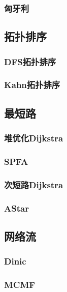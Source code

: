 \documentclass{ctexart}
\begin{document}
\subsubsection{匈牙利}

\subsection{拓扑排序}
\subsubsection{DFS拓扑排序}

\subsubsection{Kahn拓扑排序}

\subsection{最短路}
\subsubsection{堆优化Dijkstra}

\subsubsection{SPFA}

\subsubsection{次短路Dijkstra}

\subsubsection{AStar}

\subsection{网络流}
\subsubsection{Dinic}

\subsubsection{MCMF}

\end{document}
